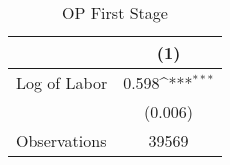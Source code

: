 \begin{table}[htbp]\centering
\def\sym#1{\ifmmode^{#1}\else\(^{#1}\)\fi}
\caption{OP First Stage}
\begin{tabular}{l*{1}{c}}
\toprule
                    &\multicolumn{1}{c}{(1)}         \\
\midrule
Log of Labor        &       0.598\sym{***}\\
                    &     (0.006)         \\
\midrule
Observations        &       39569         \\
\bottomrule
\end{tabular}
\end{table}

